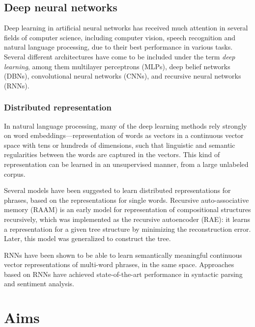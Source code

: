 \documentclass[11pt]{article}
\begin{document}
\subsection{Deep neural networks}

Deep learning in artificial neural networks has received much attention in several fields of computer science, including computer vision, speech recognition and natural language processing, due to their best performance in various tasks\cite{Collobert:2011:NLP:1953048.2078186}. Several different architectures have come to be included under the term \textit{deep learning}, among them multilayer perceptrons (MLPs), deep belief networks (DBNs), convolutional neural networks (CNNs), and recursive neural networks (RNNs).


\subsubsection{Distributed representation}

In natural language processing, many of the deep learning methods rely strongly on word embeddings---representation of words as vectors in a continuous vector space with tens or hundreds of dimensions\cite{turian2010word}, such that linguistic and semantic regularities between the words are captured in the vectors\cite{mikolovlinguistic}. This kind of representation can be learned in an unsupervised manner, from a large unlabeled corpus.

Several models have been suggested to learn distributed representations for phrases, based on the representations for single words. Recursive auto-associative memory (RAAM) is an early model for representation of compositional structures recursively\cite{pollack1990recursive}, which was implemented as the recursive autoencoder (RAE): it learns a representation for a given tree structure by minimizing the reconstruction error. Later, this model was generalized to construct the tree\cite{socher2011rae}.

RNNs have been shown to be able to learn semantically meaningful continuous vector representations of multi-word phrases, in the same space\cite{socher2010learning}. Approaches based on RNNs have achieved state-of-the-art performance in syntactic parsing and sentiment analysis\cite{socher2013parsing}\cite{socher2013recursive}.



\section{Aims}
\end{document}
